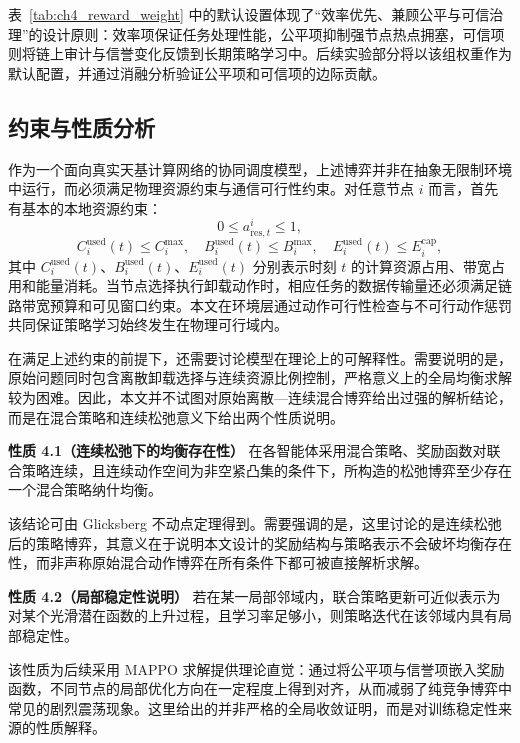 表~\ref{tab:ch4_reward_weight} 中的默认设置体现了“效率优先、兼顾公平与可信治理”的设计原则：效率项保证任务处理性能，公平项抑制强节点热点拥塞，可信项则将链上审计与信誉变化反馈到长期策略学习中。后续实验部分将以该组权重作为默认配置，并通过消融分析验证公平项和可信项的边际贡献。

\subsection{约束与性质分析}

作为一个面向真实天基计算网络的协同调度模型，上述博弈并非在抽象无限制环境中运行，而必须满足物理资源约束与通信可行性约束。对任意节点 $i$ 而言，首先有基本的本地资源约束：
\begin{equation}
    0 \le a_{\mathrm{res},t}^i \le 1,
    \label{eq:ch4_res_ratio}
\end{equation}
\begin{equation}
    C_i^{\mathrm{used}}(t)\le C_i^{\max},\quad
    B_i^{\mathrm{used}}(t)\le B_i^{\max},\quad
    E_i^{\mathrm{used}}(t)\le E_i^{\mathrm{cap}},
    \label{eq:ch4_resource_const}
\end{equation}
其中 $C_i^{\mathrm{used}}(t)$、$B_i^{\mathrm{used}}(t)$、$E_i^{\mathrm{used}}(t)$ 分别表示时刻 $t$ 的计算资源占用、带宽占用和能量消耗。当节点选择执行卸载动作时，相应任务的数据传输量还必须满足链路带宽预算和可见窗口约束。本文在环境层通过动作可行性检查与不可行动作惩罚共同保证策略学习始终发生在物理可行域内。

在满足上述约束的前提下，还需要讨论模型在理论上的可解释性。需要说明的是，原始问题同时包含离散卸载选择与连续资源比例控制，严格意义上的全局均衡求解较为困难。因此，本文并不试图对原始离散—连续混合博弈给出过强的解析结论，而是在混合策略和连续松弛意义下给出两个性质说明。

\textbf{性质 4.1（连续松弛下的均衡存在性）} 在各智能体采用混合策略、奖励函数对联合策略连续，且连续动作空间为非空紧凸集的条件下，所构造的松弛博弈至少存在一个混合策略纳什均衡\cite{Glicksberg1952}。

该结论可由 Glicksberg 不动点定理得到。需要强调的是，这里讨论的是连续松弛后的策略博弈，其意义在于说明本文设计的奖励结构与策略表示不会破坏均衡存在性，而非声称原始混合动作博弈在所有条件下都可被直接解析求解。

\textbf{性质 4.2（局部稳定性说明）} 若在某一局部邻域内，联合策略更新可近似表示为对某个光滑潜在函数的上升过程，且学习率足够小，则策略迭代在该邻域内具有局部稳定性。

该性质为后续采用 MAPPO 求解提供理论直觉：通过将公平项与信誉项嵌入奖励函数，不同节点的局部优化方向在一定程度上得到对齐，从而减弱了纯竞争博弈中常见的剧烈震荡现象。这里给出的并非严格的全局收敛证明，而是对训练稳定性来源的性质解释。

